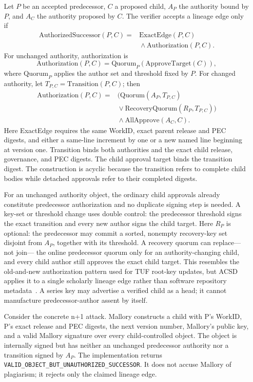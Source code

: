 \documentclass[acmsmall,screen,review,nonacm]{acmart}
\begin{document}
Let $P$ be an accepted predecessor, $C$ a proposed child, $A_P$ the authority
bound by $P$, and $A_C$ the authority proposed by $C$. The verifier accepts a
lineage edge only if
\[
\begin{aligned}
 \mathrm{AuthorizedSuccessor}(P,C) ={}& \mathrm{ExactEdge}(P,C)\\
 &{}\land \mathrm{Authorization}(P,C).
\end{aligned}
\]
For unchanged authority, authorization is
\[
 \mathrm{Authorization}(P,C)=
 \mathrm{Quorum}_{P}(\mathrm{ApproveTarget}(C)),
\]
where $\mathrm{Quorum}_{P}$ applies the author set and threshold fixed by $P$.
For changed authority, let $T_{P,C}=\mathrm{Transition}(P,C)$; then
\[
\begin{aligned}
 \mathrm{Authorization}(P,C) ={}&
   \bigl(\mathrm{Quorum}(A_P,T_{P,C})\\
 &{}\lor \mathrm{RecoveryQuorum}(R_P,T_{P,C})\bigr)\\
 &{}\land \mathrm{AllApprove}(A_C,C).
\end{aligned}
\]
Here \textsf{ExactEdge} requires the same WorkID, exact parent release and PEC
digests, and either a same-line increment by one or a new named line beginning
at version one. \textsf{Transition} binds both authorities and the exact child
release, governance, and PEC digests. The child approval target binds the
transition digest. The construction is acyclic because the transition refers
to complete child bodies while detached approvals refer to their completed
digests.

For an unchanged authority object, the ordinary child approvals already constitute
predecessor authorization and no duplicate signing step is needed. A key-set or
threshold change uses double control: the predecessor threshold signs the exact
transition and every new author signs the child target. Here $R_P$ is optional:
the predecessor may commit a sorted, nonempty recovery-key set disjoint from
$A_P$, together with its threshold. A recovery quorum can replace---not join---
the online predecessor quorum only for an authority-changing child, and every
child author still approves the exact child target. This resembles the
old-and-new authorization pattern used for TUF root-key updates, but ACSD
applies it to a single scholarly lineage edge rather than software repository
metadata~\cite{tufspec}. A series key may advertise a verified child as a head;
it cannot manufacture predecessor-author assent by itself.

Consider the concrete n+1 attack. Mallory constructs a child with P's WorkID,
P's exact release and PEC digests, the next version number, Mallory's public
key, and a valid Mallory signature over every child-controlled object. The
object is internally signed but has neither an unchanged predecessor authority
nor a transition signed by $A_P$. The implementation returns
\texttt{VALID\_OBJECT\_BUT\_UNAUTHORIZED\_SUCCESSOR}. It does not accuse
Mallory of plagiarism; it rejects only the claimed lineage edge.
\end{document}
